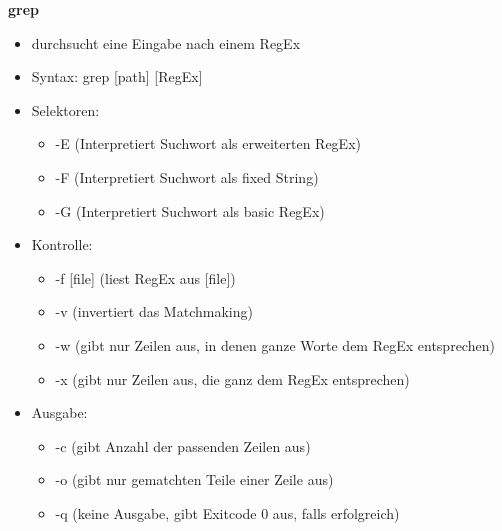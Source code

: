 \documentclass[12pt,utf8, 10pt]{article}
\begin{document}
\textbf{grep}
\begin{itemize}
	\item durchsucht eine Eingabe nach einem RegEx
	\item Syntax: grep [path] [RegEx]
	\item Selektoren:
	\begin{itemize}
		\item -E (Interpretiert Suchwort als erweiterten RegEx)
		\item -F (Interpretiert Suchwort als fixed String)
		\item -G (Interpretiert Suchwort als basic RegEx)
	\end{itemize}
	\item Kontrolle:
	\begin{itemize}
		\item -f [file] (liest RegEx aus [file])
		\item -v (invertiert das Matchmaking)
		\item -w (gibt nur Zeilen aus, in denen ganze Worte dem RegEx entsprechen)
		\item -x (gibt nur Zeilen aus, die ganz dem RegEx entsprechen)
	\end{itemize}
	\item Ausgabe:
	\begin{itemize}
		\item -c (gibt Anzahl der passenden Zeilen aus)
		\item -o (gibt nur gematchten Teile einer Zeile aus)
		\item -q (keine Ausgabe, gibt Exitcode 0 aus, falls erfolgreich)
	\end{itemize}
\end{itemize}
\end{document}
